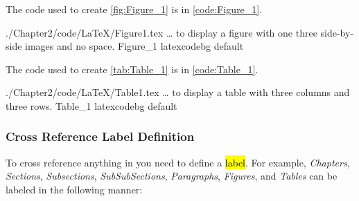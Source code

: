 \documentclass[../Dissertation]{subfiles}
\begin{document}
    The  code used to create \cref{fig:Figure_1} is in
    \cref{code:Figure_1}.  
    
        {./Chapter2/code/LaTeX/Figure1.tex}
        {\ldots {} to display a figure with one three side-by-side images and no space.}
        {Figure_1}
        {\footnotesize}
        {latexcodebg}
        {default}
    
    \lipsum[1-2]
    
    The  code used to create \cref{tab:Table_1} is in
    \cref{code:Table_1}.  
    
        {./Chapter2/code/LaTeX/Table1.tex}
        {\ldots {} to display a table with three columns and three rows.}
        {Table_1}
        {\footnotesize}
        {latexcodebg}
        {default}
    
\subsubsection{Cross Reference Label Definition}\label{sss:labeling}
    To cross reference anything in  you need to define a \hl{label}.
    For example, \emph{Chapters}, \emph{Sections}, \emph{Subsections},
    \emph{SubSubSections}, \emph{Paragraphs}, \emph{Figures}, and \emph{Tables}
    can be labeled in the following manner:
    
\end{document}
